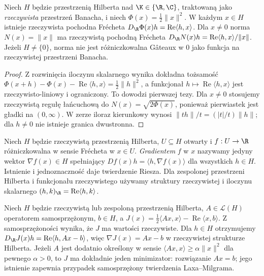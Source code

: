 \begin{twierdzenie}
\label{thm:hilbert-norm14}
Niech $H$ będzie przestrzenią Hilberta nad $\K\in\{\R,\C\}$, traktowaną jako \emph{rzeczywista} przestrzeń Banacha, i niech $\Phi(x)=\frac12\|x\|^2$. W każdym $x\in H$ istnieje rzeczywista pochodna Frécheta $D_{\R}\Phi(x)h=\operatorname{Re}\langle h,x\rangle$. Dla $x\ne0$ norma $N(x)=\|x\|$ ma rzeczywistą pochodną Frécheta
$D_{\R}N(x)h=\operatorname{Re}\langle h,x\rangle/\|x\|$.
Jeżeli $H\ne\{0\}$, norma nie jest różniczkowalna Gâteaux w $0$ jako funkcja na rzeczywistej przestrzeni Banacha.
\end{twierdzenie}
\begin{proof}
Z rozwinięcia iloczynu skalarnego wynika dokładna tożsamość
$\Phi(x+h)-\Phi(x)-\operatorname{Re}\langle h,x\rangle=\frac12\|h\|^2$, a funkcjonał $h\mapsto\operatorname{Re}\langle h,x\rangle$ jest rzeczywisto-liniowy i ograniczony. To dowodzi pierwszej tezy. Dla $x\ne0$ stosujemy rzeczywistą regułę łańcuchową do $N(x)=\sqrt{2\Phi(x)}$, ponieważ pierwiastek jest gładki na $(0,\infty)$. W zerze iloraz kierunkowy wynosi $\|th\|/t=(|t|/t)\|h\|$; dla $h\ne0$ nie istnieje granica dwustronna.
\end{proof}

\begin{definicja}
\label{def:gradient14}
Niech $H$ będzie rzeczywistą przestrzenią Hilberta, $U\subseteq H$ otwarty i $f:U\to\R$ różniczkowalna w sensie Frécheta w $x\in U$. \emph{Gradientem} $f$ w $x$ nazywamy jedyny wektor $\nabla f(x)\in H$ spełniający $Df(x)h=\langle h,\nabla f(x)\rangle$ dla wszystkich $h\in H$. Istnienie i jednoznaczność daje twierdzenie Riesza. Dla zespolonej przestrzeni Hilberta i funkcjonału rzeczywistego używamy struktury rzeczywistej i iloczynu skalarnego $(h,k)_{\R}=\operatorname{Re}\langle h,k\rangle$.
\end{definicja}

\begin{przyklad}
\label{ex:quadratic-energy14}
Niech $H$ będzie rzeczywistą lub zespoloną przestrzenią Hilberta, $A\in\mathcal L(H)$ operatorem samosprzężonym, $b\in H$, a $J(x)=\frac12\langle Ax,x\rangle-\operatorname{Re}\langle x,b\rangle$. Z samosprzężoności wynika, że $J$ ma wartości rzeczywiste. Dla $h\in H$ otrzymujemy
$D_{\R}J(x)h=\operatorname{Re}\langle h,Ax-b\rangle$, więc $\nabla J(x)=Ax-b$ w rzeczywistej strukturze Hilberta. Jeżeli $A$ jest dodatnio określony w sensie $\langle Ax,x\rangle\ge\alpha\|x\|^2$ dla pewnego $\alpha>0$, to $J$ ma dokładnie jeden minimizator: rozwiązanie $Ax=b$; jego istnienie zapewnia przypadek samosprzężony twierdzenia Laxa--Milgrama.
\end{przyklad}

